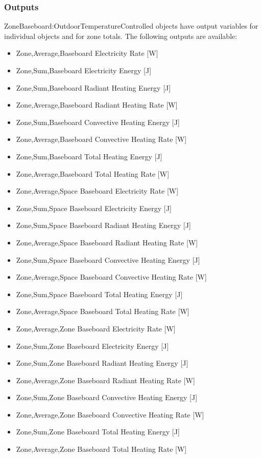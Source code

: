 \subsubsection{Outputs}\label{outputs-14-002}

ZoneBaseboard:OutdoorTemperatureControlled objects have output variables for individual objects and for zone totals. The following outputs are available:

\begin{itemize}
\tightlist
\item
  Zone,Average,Baseboard Electricity Rate {[}W{]}
\item
  Zone,Sum,Baseboard Electricity Energy {[}J{]}
\item
  Zone,Sum,Baseboard Radiant Heating Energy {[}J{]}
\item
  Zone,Average,Baseboard Radiant Heating Rate {[}W{]}
\item
  Zone,Sum,Baseboard Convective Heating Energy {[}J{]}
\item
  Zone,Average,Baseboard Convective Heating Rate {[}W{]}
\item
  Zone,Sum,Baseboard Total Heating Energy {[}J{]}
\item
  Zone,Average,Baseboard Total Heating Rate {[}W{]}
\item
  Zone,Average,Space Baseboard Electricity Rate {[}W{]}
\item
  Zone,Sum,Space Baseboard Electricity Energy {[}J{]}
\item
  Zone,Sum,Space Baseboard Radiant Heating Energy {[}J{]}
\item
  Zone,Average,Space Baseboard Radiant Heating Rate {[}W{]}
\item
  Zone,Sum,Space Baseboard Convective Heating Energy {[}J{]}
\item
  Zone,Average,Space Baseboard Convective Heating Rate {[}W{]}
\item
  Zone,Sum,Space Baseboard Total Heating Energy {[}J{]}
\item
  Zone,Average,Space Baseboard Total Heating Rate {[}W{]}
\item
  Zone,Average,Zone Baseboard Electricity Rate {[}W{]}
\item
  Zone,Sum,Zone Baseboard Electricity Energy {[}J{]}
\item
  Zone,Sum,Zone Baseboard Radiant Heating Energy {[}J{]}
\item
  Zone,Average,Zone Baseboard Radiant Heating Rate {[}W{]}
\item
  Zone,Sum,Zone Baseboard Convective Heating Energy {[}J{]}
\item
  Zone,Average,Zone Baseboard Convective Heating Rate {[}W{]}
\item
  Zone,Sum,Zone Baseboard Total Heating Energy {[}J{]}
\item
  Zone,Average,Zone Baseboard Total Heating Rate {[}W{]}
\end{itemize}

